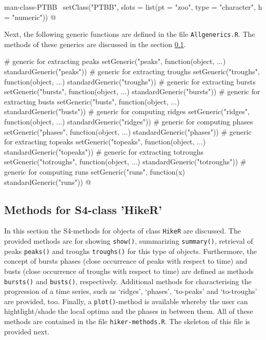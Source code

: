\documentclass[a4paper]{article}
\begin{document}
\nwenddocs{}\endmoddef
\LA{}man-class-PTBB~{\nwtagstyle{}}\RA{}
setClass("PTBB", slots = list(pt = "zoo",
                              type = "character",
                              h = "numeric"))
\nwendcode{}@

Next, the following generic functions are defined in the file
\verb?Allgenerics.R?. The methods of these generics are discussed in the
section \ref{S3SS3}.

\nwenddocs{}\endmoddef\let\nwnotused=\nwoutput{}
# generic for extracting peaks
setGeneric("peaks", function(object, ...) standardGeneric("peaks"))
# generic for extracting troughs
setGeneric("troughs", function(object, ...) standardGeneric("troughs"))
# generic for extracting bursts
setGeneric("bursts", function(object, ...) standardGeneric("bursts"))
# generic for extracting busts
setGeneric("busts", function(object, ...) standardGeneric("busts"))
# generic for computing ridges
setGeneric("ridges", function(object, ...) standardGeneric("ridges"))
# generic for computing phases
setGeneric("phases", function(object, ...) standardGeneric("phases"))
# generic for extracting topeaks
setGeneric("topeaks", function(object, ...) standardGeneric("topeaks"))
# generic for extracting totroughs
setGeneric("totroughs", function(object, ...) standardGeneric("totroughs"))
# generic for computing runs
setGeneric("runs", function(x) standardGeneric("runs"))
\nwnotused{Allgenerics.R}\nwendcode{}@

\subsection{Methods for S4-class 'HikeR'}
\label{S3SS3}

In this section the S4-methods for objects of class \verb?HikeR? are
discussed. The provided methods are for showing \verb?show()?,
summarizing \verb?summary()?, retrieval of peaks \verb?peaks()? and troughs
\verb?troughs()? for this type of objects. Furthermore, the concept of
bursts phases (close occurrence of peaks with respect to time) and
busts (close occurrence of troughs with respect to time) are defined
as methods \verb?bursts()? and \verb?busts()?, respectively. Additional
methods for characterising the progression of a time series, such as
`ridges', `phases', `to-peaks' and `to-troughs' are provided,
too. Finally, a \verb?plot()?-method is available whereby the user can
hightlight/shade the local optima and the phases in between them. All
of these methods are contained in the file \verb?hiker-methods.R?. The
skeleton of this file is provided next.
\end{document}
